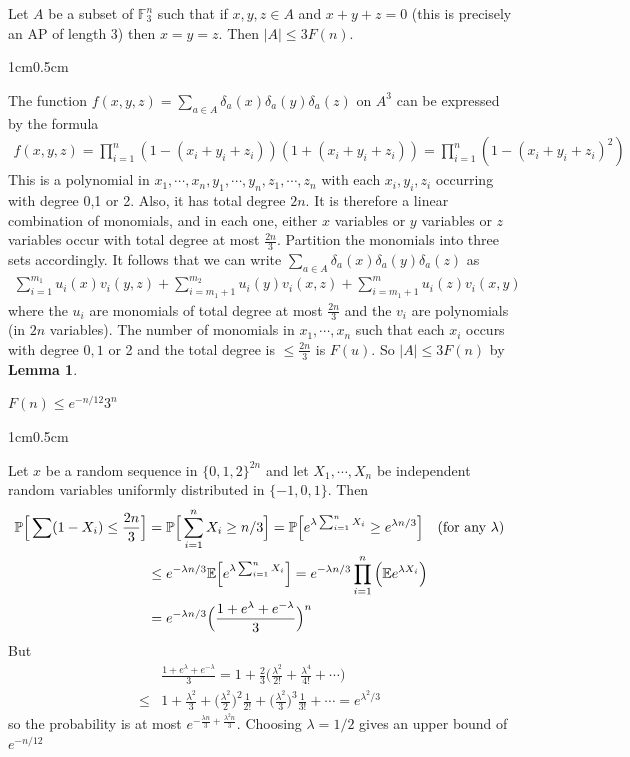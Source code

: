 \documentclass[12pt,a4paper]{report}
\newenvironment{proof}
{\begin{changemargin}{1cm}{0.5cm}
	}%
	{\end{changemargin}
}
\begin{document}
 Let $A$ be a subset of $\mathbb{F}_3^n$ such that if $x,y,z\in A$ and $x+y+z = 0$ (this is precisely an AP of length 3) then $x=y=z$. Then $|A| \leq 3F(n)$.
\begin{proof}
\pf The function $f(x,y,z)=\sum_{a\in A} \delta_a(x) \delta_a(y) \delta_a(z)$ on $A^3$ can be expressed by the formula
\begin{align*}
f(x,y,z) = \prod_{i=1}^n (1-(x_i+y_i + z_i))(1+(x_i+y_i + z_i)) = \prod_{i=1}^n (1-(x_i+y_i + z_i)^2)
\end{align*}
This is a polynomial in $x_1, \cdots, x_n, y_1, \cdots, y_n, z_1, \cdots, z_n$ with each $x_i, y_i, z_i$ occurring with degree 0,1 or 2. Also, it has total degree $2n$. It is therefore a linear combination of monomials, and in each one, either $x$ variables or $y$ variables or $z$ variables occur with total degree at most $\frac{2n}{3}$. Partition the monomials into three sets accordingly. It follows that we can write $\sum_{a\in A} \delta_a(x) \delta_a(y) \delta_a(z)$ as
\begin{align*}
\sum_{i=1}^{m_1} u_i(x) v_i(y,z) + \sum_{i=m_1+1}^{m_2} u_i(y) v_i(x,z) + \sum_{i=m_1+1}^m u_i(z) v_i(x,y)
\end{align*}
where the $u_i$ are monomials of total degree at most $\frac{2n}{3}$ and the $v_i$ are polynomials (in $2n$ variables). The number of monomials in $x_1, \cdots, x_n$ such that each $x_i$ occurs with degree $0,1$ or 2 and the total degree is $\leq \frac{2n}{3}$ is $F(u)$. So $|A| \leq 3F(n)$ by \textbf{Lemma 1}.

\eop 
\end{proof}
\s

 $F(n) \leq e^{-n/12} 3^n$
\begin{proof}
\pf Let $x$ be a random sequence in $\{ 0,1,2 \}^{2n}$ and let $X_1, \cdots, X_n$ be independent random variables uniformly distributed in $\{-1,0,1\}$. Then
\begin{align*}
\mathbb{P} \Big[\sum (1-X_i) \leq \frac{2n}{3} \Big] &= \mathbb{P} \Big[\sum_{i=1}^n X_i \geq n/3 \Big] = \mathbb{P} \Big[e^{\lambda \sum_{i=1}^n X_i} \geq e^{\lambda n/3} \Big] \quad \text{(for any } \lambda) \\
&\leq e^{-\lambda n/3} \mathbb{E} \Big[e^{\lambda \sum_{i=1}^n X_i}\Big] = e^{-\lambda n/3} \prod_{i=1}^n \Big( \mathbb{E} e^{\lambda X_i} \Big) \\
&= e^{-\lambda n/3} \Big( \frac{1+e^{\lambda}+e^{-\lambda}}{3} \Big)^n 
\end{align*}
But
\begin{align*}
& \frac{1+e^{\lambda}+e^{-\lambda}}{3} = 1+ \frac{2}{3} \Big( \frac{\lambda^2}{2!} + \frac{\lambda^4}{4!} + \cdots  \Big) \\
\leq & 1+ \frac{\lambda^2}{3} + \Big( \frac{\lambda^2}{2} \Big)^2 \frac{1}{2!}  + \Big( \frac{\lambda^2}{3} \Big)^3 \frac{1}{3!} + \cdots = e^{\lambda^2/3}
\end{align*}
so the probability is at most $e^{-\frac{\lambda n}{3} + \frac{\lambda^2 n}{3}}$. Choosing $\lambda =1/2$ gives an upper bound of $e^{-n/12}$

\eop
\end{proof}
\s
\end{document}
